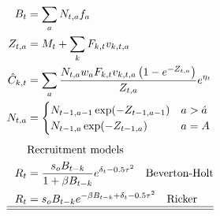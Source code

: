 \begin{table}[!tpb]
\begin{align}
        B_t&=\sum_a N_{t,a}f_a \label{T4.8}\\
        Z_{t,a}&=M_t+\sum_k F_{k,t} v_{k,t,a}\label{T4.9}\\
        \hat{C}_{k,t}&=\sum _ a\frac {N_{{t,a}}w_{{a}}F_{k,t} v_{{k,t,a}}
        \left( 1-{e^{-Z_{t,a}}} \right) }{Z_{t,a}} e^{\eta_t} \label{T4.10}\\
        N_{t,a}&=\begin{cases}
            N_{t-1,a-1} \exp(-Z_{t-1,a-1}) &a>\acute{a}\\
            N_{t-1,a} \exp(-Z_{t-1,a}) & a=A
        \end{cases}\label{T4.11}\\[1ex]
        &\mbox{Recruitment models} \nonumber\\
        R_t &= \frac{s_oB_{t-k}}{1+\beta B_{t-k}}e^{\delta_{t}-0.5\tau^2}\label{T4.12}
        	\quad \mbox{Beverton-Holt}  \\
        R_t &= s_oB_{t-k}e^{-\beta B_{t-k}+\delta_t-0.5\tau^2}\label{T4.13}
        	\quad \mbox{Ricker} \\
        \hline \hline \nonumber
    \end{align}

    \normalEq
\end{table}

